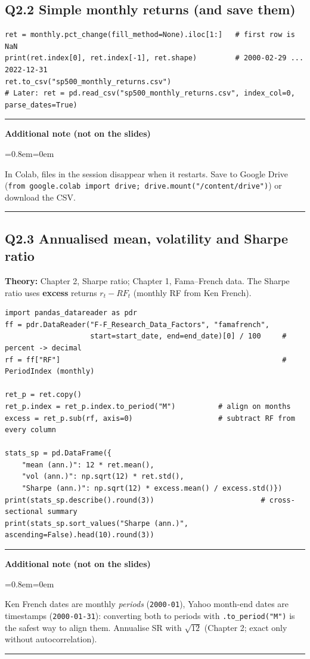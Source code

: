 \documentclass[11pt,a4paper]{report}
\newenvironment{notebox}[1]
  {\par\medskip\Needspace{6\baselineskip}\noindent\rule{\linewidth}{0.4pt}\par\nopagebreak
   \noindent\textbf{#1}\par\nopagebreak
   \begin{list}{}{\leftmargin=0.8em\rightmargin=0em\topsep=2pt}\item[]}
  {\end{list}\nopagebreak\noindent\rule{\linewidth}{0.4pt}\par\medskip}
\newenvironment{addnote}{\begin{notebox}{Additional note (not on the slides)}}{\end{notebox}}
\begin{document}
\subsection*{Q2.2 Simple monthly returns (and save them)}
\begin{lstlisting}
ret = monthly.pct_change(fill_method=None).iloc[1:]   # first row is NaN
print(ret.index[0], ret.index[-1], ret.shape)         # 2000-02-29 ... 2022-12-31
ret.to_csv("sp500_monthly_returns.csv")
# Later: ret = pd.read_csv("sp500_monthly_returns.csv", index_col=0, parse_dates=True)
\end{lstlisting}
\begin{addnote}
In Colab, files in the session disappear when it restarts. Save to Google Drive
(\texttt{from google.colab import drive; drive.mount("/content/drive")}) or download the CSV.
\end{addnote}

\subsection*{Q2.3 Annualised mean, volatility and Sharpe ratio}
\textbf{Theory:} Chapter 2, Sharpe ratio; Chapter 1, Fama--French data. The
Sharpe ratio uses \textbf{excess} returns $r_t-RF_t$ (monthly RF from Ken French).
\begin{lstlisting}
import pandas_datareader as pdr
ff = pdr.DataReader("F-F_Research_Data_Factors", "famafrench",
                    start=start_date, end=end_date)[0] / 100     # percent -> decimal
rf = ff["RF"]                                                    # PeriodIndex (monthly)

ret_p = ret.copy()
ret_p.index = ret_p.index.to_period("M")          # align on months
excess = ret_p.sub(rf, axis=0)                    # subtract RF from every column

stats_sp = pd.DataFrame({
    "mean (ann.)": 12 * ret.mean(),
    "vol (ann.)": np.sqrt(12) * ret.std(),
    "Sharpe (ann.)": np.sqrt(12) * excess.mean() / excess.std()})
print(stats_sp.describe().round(3))                         # cross-sectional summary
print(stats_sp.sort_values("Sharpe (ann.)", ascending=False).head(10).round(3))
\end{lstlisting}
\begin{addnote}
Ken French dates are monthly \emph{periods} (\texttt{2000-01}), Yahoo month-end
dates are timestamps (\texttt{2000-01-31}): converting both to periods with
\texttt{.to\_period("M")} is the safest way to align them. Annualise SR with
$\sqrt{12}$ (Chapter 2; exact only without autocorrelation).
\end{addnote}
\end{document}
